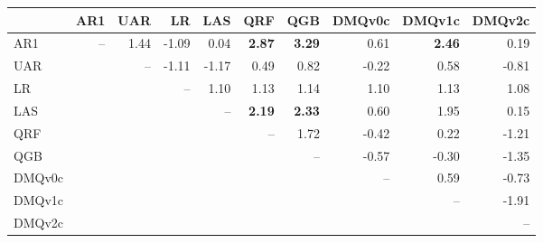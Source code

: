 \begin{tabular}{lrrrrrrrrr}
\toprule
 & AR1 & UAR & LR & LAS & QRF & QGB & DMQv0c & DMQv1c & DMQv2c \\
\midrule
AR1 & -- & 1.44 & -1.09 & 0.04 & \textbf{2.87} & \textbf{3.29} & 0.61 & \textbf{2.46} & 0.19 \\
UAR &  & -- & -1.11 & -1.17 & 0.49 & 0.82 & -0.22 & 0.58 & -0.81 \\
LR &  &  & -- & 1.10 & 1.13 & 1.14 & 1.10 & 1.13 & 1.08 \\
LAS &  &  &  & -- & \textbf{2.19} & \textbf{2.33} & 0.60 & 1.95 & 0.15 \\
QRF &  &  &  &  & -- & 1.72 & -0.42 & 0.22 & -1.21 \\
QGB &  &  &  &  &  & -- & -0.57 & -0.30 & -1.35 \\
DMQv0c &  &  &  &  &  &  & -- & 0.59 & -0.73 \\
DMQv1c &  &  &  &  &  &  &  & -- & -1.91 \\
DMQv2c &  &  &  &  &  &  &  &  & -- \\
\bottomrule
\end{tabular}
